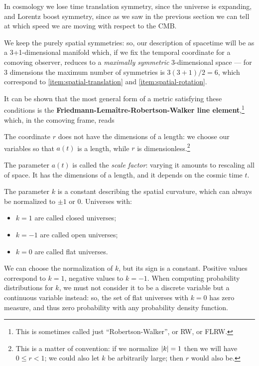 \documentclass[main.tex]{subfiles}
\begin{document}
In cosmology we lose time translation symmetry, since the universe is expanding, and Lorentz boost symmetry, since as we saw in the previous section we can tell at which speed we are moving with respect to the CMB.

We keep the purely spatial symmetries: so, our description of spacetime will be as a 3+1-dimensional manifold which, if we fix the temporal coordinate for a comoving observer, reduces to a \emph{maximally symmetric} 3-dimensional space --- for 3 dimensions the maximum number of symmetries is \(3(3+1) / 2 = 6\), which correspond to \ref{item:spatial-translation} and \ref{item:spatial-rotation}. 

It can be shown that the most general form of a metric satisfying these conditions is the \textbf{Friedmann-Lemaître-Robertson-Walker line element},\footnote{This is sometimes called just ``Robertson-Walker'', or RW, or FLRW.} which, in the comoving frame, reads
%
%


The coordinate \(r\) does not have the dimensions of a length: we choose our variables so that \(a(t)\) is a length, while \(r\) is dimensionless.\footnote{This is a matter of convention: if we normalize \(\abs{k}=1\) then we will have \(0 \leq r < 1\); we could also let \(k\) be arbitrarily large; then \(r\) would also be.}

The parameter \(a(t)\) is called the \emph{scale factor}: varying it amounts to rescaling all of space.
It has the dimensions of a length, and it depends on the cosmic time \(t\).

The parameter \(k\) is a constant describing the spatial curvature, which can always be normalized to \(\pm 1\) or \(0\).
Universes with:
\begin{itemize}
    \item \(k=1\) are called closed universes;
    \item \(k=-1\) are called open universes;
    \item \(k=0\) are called flat universes.
\end{itemize}

We can choose the normalization of \(k\), but its sign is a constant.
Positive values correspond to \(k=1\), negative values to \(k=-1\).
When computing probability distributions for \(k\), we must not consider it to be a discrete variable but a continuous variable instead: so, the set of flat universes with \(k=0\) has zero measure, and thus zero probability with any probability density function.
\end{document}
